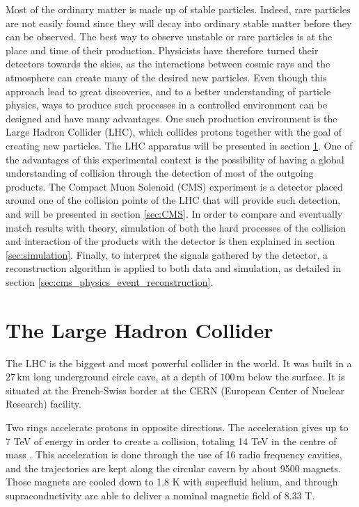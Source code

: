 
Most of the ordinary matter is made up of stable particles. Indeed, rare particles are not easily found since they will decay into ordinary stable matter before they can be observed. The best way to observe unstable or rare particles is at the place and time of their production. Physicists have therefore turned their detectors towards the skies, as the interactions between cosmic rays and the atmosphere can create many of the desired new particles. Even though this approach lead to great discoveries, and to a better understanding of particle physics, ways to produce such processes in a controlled environment can be designed and have many advantages. One such production environment is the Large Hadron Collider (LHC), which collides protons together with the goal of creating new particles. The LHC apparatus will be presented in section \ref{sec:LHC}. One of the advantages of this experimental context is the possibility of having a global understanding of collision through the detection of most of the outgoing products. The Compact Muon Solenoid (CMS) experiment is a detector placed around one of the collision points of the LHC that will provide such detection, and will be presented in section \ref{sec:CMS}. In order to compare and eventually match results with theory, simulation of both the hard processes of the collision and interaction of the products with the detector is then explained in section \ref{sec:simulation}. Finally, to interpret the signals gathered by the detector, a reconstruction algorithm is applied to both data and simulation, as detailed in section \ref{sec:cms_physics_event_reconstruction}.

\section{The Large Hadron Collider}
\label{sec:LHC}

The LHC is the biggest and most powerful collider in the world. It was built in a $27\,\mathrm{km}$ long underground circle cave, at a depth of $100\,\mathrm{m}$ below the surface. It is situated at the French-Swiss border at the CERN (European Center of Nuclear Research) facility.

Two rings accelerate protons in opposite directions. The acceleration gives up to 7 TeV of energy in order to create a collision, totaling 14 TeV in the centre of mass \cite{Bruning:782076,Bruning:815187,Benedikt:823808}. This acceleration is done through the use of 16 radio frequency cavities, and the trajectories are kept along the circular cavern by about 9500 magnets. Those magnets are cooled down to 1.8 K with superfluid helium, and through supraconductivity are able to deliver a nominal magnetic field of 8.33 T.


